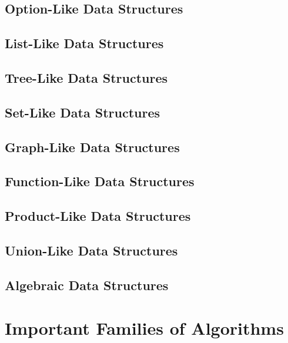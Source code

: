\documentclass{book}
\begin{document}
\chapter{Option-Like Data Structures}\label{sec:ad:option}
 

\chapter{List-Like Data Structures}\label{sec:ad:lists}
 

\chapter{Tree-Like Data Structures}\label{sec:ad:trees}
 

\chapter{Set-Like Data Structures}\label{sec:ad:sets}
 

\chapter{Graph-Like Data Structures}\label{sec:ad:graphs}
 

\chapter{Function-Like Data Structures}\label{sec:ad:functions}
 

\chapter{Product-Like Data Structures}\label{sec:ad:products}
 

\chapter{Union-Like Data Structures}\label{sec:ad:unions}
 

\chapter{Algebraic Data Structures}\label{sec:ad:theories}
 

\part{Important Families of Algorithms}\label{sec:ad:algo}
\end{document}
